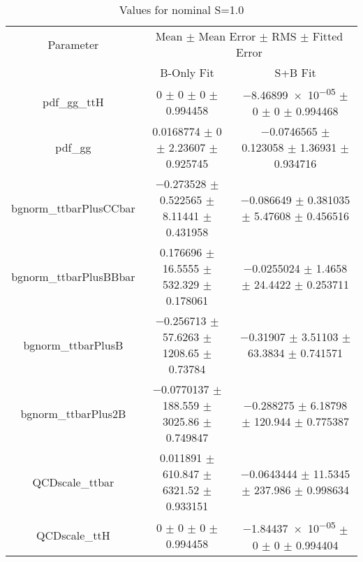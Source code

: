 \begin{table}
\centering
\caption{Values for nominal S=1.0}
\begin{tabular}{ccc}
\toprule
Parameter & \multicolumn{2}{c}{Mean $\pm$ Mean Error $\pm$ RMS $\pm$ Fitted Error}\\
 & B-Only Fit & S+B Fit\\
\midrule
pdf\_gg\_ttH & \num{0} $\pm$ \num{0} $\pm$ \num{0} $\pm$ \num{0.994458} & \num{-8.46899e-05} $\pm$ \num{0} $\pm$ \num{0} $\pm$ \num{0.994468}\\
pdf\_gg & \num{0.0168774} $\pm$ \num{0} $\pm$ \num{2.23607} $\pm$ \num{0.925745} & \num{-0.0746565} $\pm$ \num{0.123058} $\pm$ \num{1.36931} $\pm$ \num{0.934716}\\
bgnorm\_ttbarPlusCCbar & \num{-0.273528} $\pm$ \num{0.522565} $\pm$ \num{8.11441} $\pm$ \num{0.431958} & \num{-0.086649} $\pm$ \num{0.381035} $\pm$ \num{5.47608} $\pm$ \num{0.456516}\\
bgnorm\_ttbarPlusBBbar & \num{0.176696} $\pm$ \num{16.5555} $\pm$ \num{532.329} $\pm$ \num{0.178061} & \num{-0.0255024} $\pm$ \num{1.4658} $\pm$ \num{24.4422} $\pm$ \num{0.253711}\\
bgnorm\_ttbarPlusB & \num{-0.256713} $\pm$ \num{57.6263} $\pm$ \num{1208.65} $\pm$ \num{0.73784} & \num{-0.31907} $\pm$ \num{3.51103} $\pm$ \num{63.3834} $\pm$ \num{0.741571}\\
bgnorm\_ttbarPlus2B & \num{-0.0770137} $\pm$ \num{188.559} $\pm$ \num{3025.86} $\pm$ \num{0.749847} & \num{-0.288275} $\pm$ \num{6.18798} $\pm$ \num{120.944} $\pm$ \num{0.775387}\\
QCDscale\_ttbar & \num{0.011891} $\pm$ \num{610.847} $\pm$ \num{6321.52} $\pm$ \num{0.933151} & \num{-0.0643444} $\pm$ \num{11.5345} $\pm$ \num{237.986} $\pm$ \num{0.998634}\\
QCDscale\_ttH & \num{0} $\pm$ \num{0} $\pm$ \num{0} $\pm$ \num{0.994458} & \num{-1.84437e-05} $\pm$ \num{0} $\pm$ \num{0} $\pm$ \num{0.994404}\\
\bottomrule
\end{tabular}
\end{table}